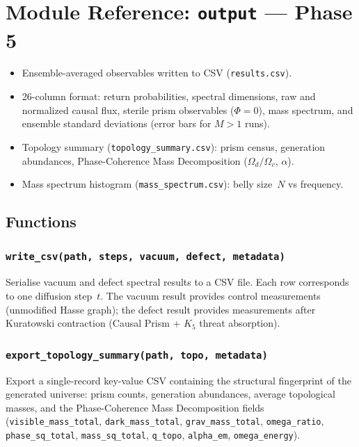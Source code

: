 \documentclass[11pt, a4paper, openany]{book}
\newcommand{\code}[1]{\texttt{#1}}
\newcommand{\func}[1]{\texttt{\color{structure}#1}}
\newcommand{\modname}[1]{\texttt{\bfseries\color{main}#1}}
\newenvironment{introduction}[1][Chapter Overview]{%
  \begin{tcolorbox}[
    enhanced,colback=structure!5,colframe=structure,
    colbacktitle=structure,coltitle=white,
    fonttitle=\small\bfseries,title={#1},
    arc=2pt,boxrule=0.7pt,
    left=8pt,right=8pt,top=6pt,bottom=6pt,
    before skip=12pt,after skip=12pt
  ]\itshape\begin{itemize}[leftmargin=*,itemsep=2pt,parsep=0pt]
}{%
  \end{itemize}\end{tcolorbox}
}
\begin{document}
\chapter{Module Reference: \modname{output} --- Phase 5}

\begin{introduction}[CSV Serialisation]
  \item Ensemble-averaged observables written to CSV (\code{results.csv}).
  \item 26-column format: return probabilities, spectral dimensions, raw and normalized
        causal flux, sterile prism observables ($\Phi = 0$), mass spectrum, and ensemble standard
        deviations (error bars for $M > 1$ runs).
  \item Topology summary (\code{topology\_summary.csv}): prism census, generation
        abundances, Phase-Coherence Mass Decomposition ($\Omega_d/\Omega_v$, $\alpha$).
  \item Mass spectrum histogram (\code{mass\_spectrum.csv}): belly size~$N$ vs frequency.
\end{introduction}

\section{Functions}

\subsection{\func{write\_csv(path, steps, vacuum, defect, metadata)}}

Serialise vacuum and defect spectral results to a CSV file.  Each row
corresponds to one diffusion step~$t$.  The vacuum result provides control
measurements (unmodified Hasse graph); the defect result provides measurements
after Kuratowski contraction (Causal Prism + $K_5$ threat absorption).

\subsection{\func{export\_topology\_summary(path, topo, metadata)}}

Export a single-record key-value CSV containing the structural fingerprint of
the generated universe: prism counts, generation abundances, average topological
masses, and the Phase-Coherence Mass Decomposition fields
(\code{visible\_mass\_total}, \code{dark\_mass\_total}, \code{grav\_mass\_total},
\code{omega\_ratio}, \code{phase\_sq\_total}, \code{mass\_sq\_total},
\code{q\_topo}, \code{alpha\_em}, \code{omega\_energy}).
\end{document}
